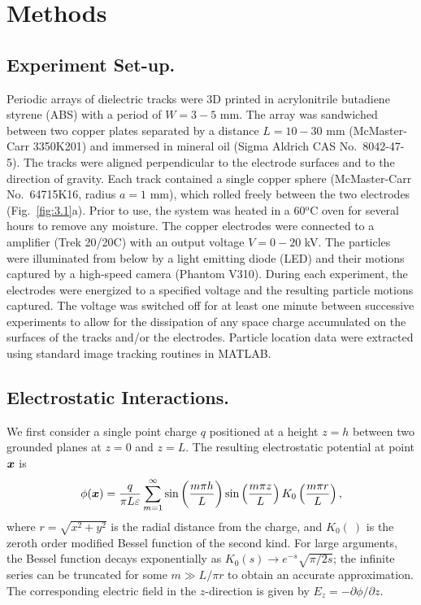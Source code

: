 \section{Methods}

\subsection{Experiment Set-up.} 
Periodic arrays of dielectric tracks were 3D printed in acrylonitrile butadiene styrene (ABS) with a period of $W=3-5$ mm. The array was sandwiched between two copper plates separated by a distance $L=10-30$ mm (McMaster-Carr 3350K201) and immersed in mineral oil (Sigma Aldrich CAS No.~8042-47-5). The tracks were aligned perpendicular to the electrode surfaces and to the direction of gravity. Each track contained a single copper sphere (McMaster-Carr No.~64715K16, radius $a=1$ mm), which rolled freely between the two electrodes (Fig.~\ref{fig:3.1}a). Prior to use, the system was heated in a 60$^\text{o}$C oven for several hours to remove any moisture. The copper electrodes were connected to a amplifier (Trek 20/20C) with an output voltage $V=0-20$ kV.  The particles were illuminated from below by a light emitting diode (LED) and their motions captured by a high-speed camera (Phantom V310).  During each experiment, the electrodes were energized to a specified voltage and the resulting particle motions captured. The voltage was switched off for at least one minute between successive experiments to allow for the dissipation of any space charge accumulated on the surfaces of the tracks and/or the electrodes.  Particle location data were extracted using standard image tracking routines in MATLAB.




\subsection{Electrostatic Interactions.}
We first consider a single point charge $q$ positioned at a height $z=h$ between two grounded planes at $z=0$ and $z=L$.  The resulting electrostatic potential at point $\boldsymbol{x}$ is 
\begin{equation}
    \phi(\boldsymbol{x}) = \frac{q}{\pi L \varepsilon} \sum_{m=1}^{\infty} \sin\left(\frac{m\pi h}{L}\right)  \sin\left(\frac{m\pi z}{L}\right) K_0\left(\frac{m \pi r}{L}\right),\label{eq:point}
\end{equation}
where $r=\sqrt{x^2 + y^2}$ is the radial distance from the charge, and $K_0(~)$ is the zeroth order modified Bessel function of the second kind. For large arguments, the Bessel function decays exponentially as $K_0(s)\rightarrow e^{-s}\sqrt{\pi/2 s} $; the infinite series can be truncated for some $m\gg L/\pi r$ to obtain an accurate approximation.  The corresponding electric field in the $z$-direction is given by $E_z = -\partial \phi / \partial z$. 

